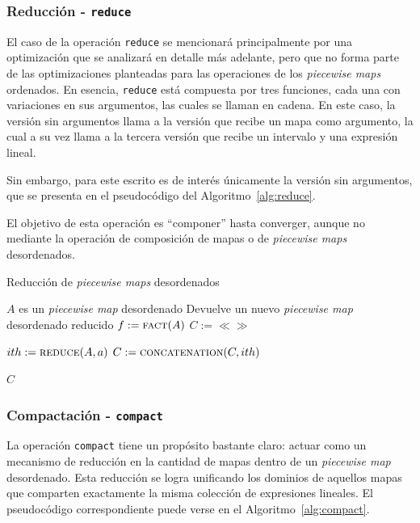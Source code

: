 \subsubsection{Reducción - \texttt{reduce}}

El caso de la operación \texttt{reduce} se mencionará principalmente por una optimización que se analizará en detalle más adelante, pero que no forma parte de las optimizaciones planteadas para las operaciones de los \textit{piecewise maps} ordenados. En esencia, \texttt{reduce} está compuesta por tres funciones, cada una con variaciones en sus argumentos, las cuales se llaman en cadena. En este caso, la versión sin argumentos llama a la versión que recibe un mapa como argumento, la cual a su vez llama a la tercera
versión que recibe un intervalo y una expresión lineal. 

Sin embargo, para este escrito es de interés únicamente la versión sin argumentos, que se presenta en el pseudocódigo del Algoritmo~\ref{alg:reduce}. 

El objetivo de esta operación es ``componer'' hasta converger, aunque no mediante la operación de composición de mapas o de \textit{piecewise maps} desordenados. 

\begin{algorithm}
\caption{Reducción de \textit{piecewise maps} desordenados}
\label{alg:reduce}
\begin{algorithmic}[1]
\Require $A$ es un \textit{piecewise map} desordenado
\Ensure Devuelve un nuevo \textit{piecewise map} desordenado reducido
    \State $f := \Call{fact}{A}$
    \State $C := \ll\gg$
    
        \State $ith := \Call{reduce}{A,a}$
        \State $C := \Call{concatenation}{C,ith}$
    \EndFor

    \State \Return $C$
\EndFunction
\end{algorithmic}
\end{algorithm}

\subsubsection{Compactación - \texttt{compact}}

La operación \texttt{compact} tiene un propósito bastante claro: actuar como un mecanismo de reducción en la cantidad de mapas dentro de un \textit{piecewise map} desordenado. Esta reducción se logra unificando los dominios de aquellos mapas que comparten exactamente la misma colección de expresiones lineales. El pseudocódigo correspondiente puede verse en el Algoritmo~\ref{alg:compact}.

